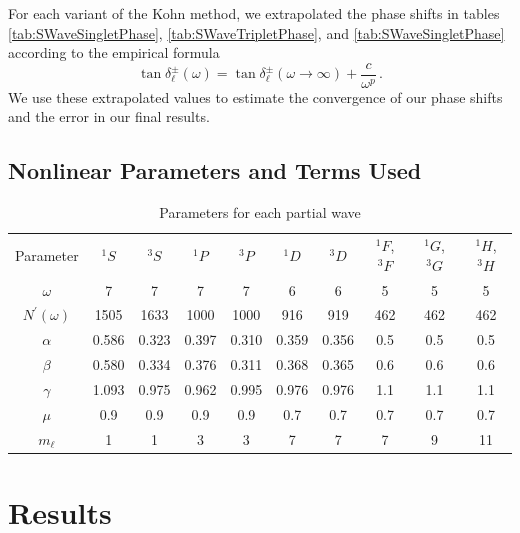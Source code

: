 \documentclass[preprint,showpacs,preprintnumbers,amsmath,amssymb]{revtex4}
\begin{document}
For each variant of the Kohn method, we extrapolated the phase shifts in tables \ref{tab:SWaveSingletPhase}, \ref{tab:SWaveTripletPhase}, and \ref{tab:SWaveSingletPhase} according to the empirical formula \cite{VanReeth2003}
\begin{equation}
\label{eq:Extrap}
\tan\delta_\ell^\pm(\omega) = \tan\delta_\ell^\pm(\omega\to\infty) + \frac{c}{\omega^p}\, .
\end{equation}
We use these extrapolated values to estimate the convergence of our phase shifts and the error in our final results.


\subsection{Nonlinear Parameters and Terms Used}
\label{sec:Parameters}

\begin{table}[H]
  \centering
	\begin{ruledtabular}
    \begin{tabular}{cccccccccc}
    Parameter & $^1S$ & $^3S$ & $^1P$ & $^3P$ & $^1D$ & $^3D$ & $^1F$, $^3F$ & $^1G$, $^3G$ & $^1H$, $^3H$ \\
    \colrule
	$\omega$           & 7     & 7     & 7     & 7     & 6     & 6     & 5    & 5   & 5 \\
	$N^\prime(\omega)$ & 1505  & 1633  & 1000  & 1000  & 916   & 919   & 462  & 462 & 462 \\
	$\alpha$           & 0.586 & 0.323 & 0.397 & 0.310 & 0.359 & 0.356 & 0.5  & 0.5 & 0.5 \\
	$\beta$            & 0.580 & 0.334 & 0.376 & 0.311 & 0.368 & 0.365 & 0.6  & 0.6 & 0.6 \\
	$\gamma$           & 1.093 & 0.975 & 0.962 & 0.995 & 0.976 & 0.976 & 1.1  & 1.1 & 1.1 \\
	$\mu$              & 0.9   & 0.9   & 0.9   & 0.9   & 0.7   & 0.7   & 0.7  & 0.7 & 0.7 \\
	$m_\ell$           & 1     & 1     & 3     & 3     & 7     & 7     & 7    & 9   & 11 \\
    \end{tabular}
  \end{ruledtabular}
  \caption{Parameters for each partial wave}
  \label{tab:Nonlinear}
\end{table}





\section{Results}
\label{sec:Results}
\end{document}
